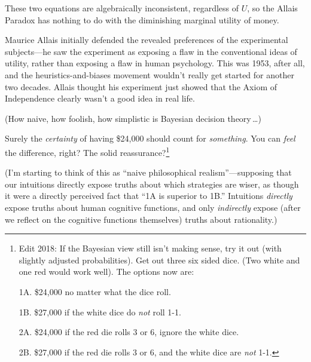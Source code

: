 


 These two equations are algebraically inconsistent, regardless of
$U$, so the Allais Paradox has nothing to do with the diminishing
marginal utility of money. 


 Maurice Allais initially defended the revealed preferences of the
experimental subjects---he saw the experiment as exposing a flaw in the
conventional ideas of utility, rather than exposing a flaw in human
psychology. This was 1953, after all, and the heuristics-and-biases
movement wouldn't really get started for another two
decades. Allais thought his experiment just showed that the Axiom of
Independence clearly wasn't a good idea in real life.


 (How naive, how foolish, how simplistic is Bayesian decision
theory\,\ldots)

 Surely the \textit{certainty} of having \$24,000 should count for
\textit{something}. You can \textit{feel} the difference, right? The
solid reassurance?\footnote{Edit 2018: If the Bayesian view still isn't making sense, try it out (with slightly adjusted probabilities). Get out three six sided dice.  (Two white and one red would work well).  The options now are:

  1A. \$24,000 no matter what the dice roll.

  1B. \$27,000 if the white dice do \textit{not} roll 1-1.

  2A. \$24,000 if the red die rolls 3 or 6, ignore the white dice.

  2B. \$27,000 if the red die rolls 3 or 6, and the white dice are \textit{not} 1-1.
}


 (I'm starting to think of this as
``naive philosophical
realism''---supposing that our intuitions directly
expose truths about which strategies are wiser, as though it were a
directly perceived fact that ``1A is superior to
1B.'' Intuitions \textit{directly} expose truths
about human cognitive functions, and only \textit{indirectly} expose
(after we reflect on the cognitive functions themselves) truths about
rationality.)


